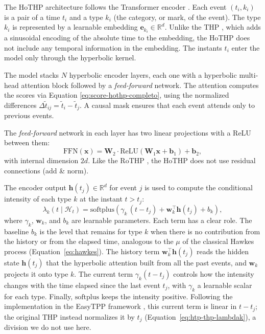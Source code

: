 The HoTHP architecture follows the Transformer encoder \cite{vaswani_attention_2017}. Each event $(t_i, k_i)$ is a pair of a time $t_i$ and a type $k_i$ (the category, or mark, of the event). The type $k_i$ is represented by a learnable embedding $\mathbf{e}_{k_i} \in \mathbb{R}^d$. Unlike the THP \cite{zuo_transformer_2021}, which adds a sinusoidal encoding of the absolute time to the embedding, the HoTHP does not include any temporal information in the embedding. The instants $t_i$ enter the model only through the hyperbolic kernel.

The model stacks $N$ hyperbolic encoder layers, each one with a hyperbolic multi-head attention block followed by a \textit{feed-forward} network. The attention computes the scores via Equation \ref{eq:score-hothp-completo}, using the normalized differences $\Delta\tilde{t}_{ij} = \tilde{t}_i - \tilde{t}_j$. A causal mask ensures that each event attends only to previous events.

The \textit{feed-forward} network in each layer has two linear projections with a ReLU between them:
%
\begin{equation}
    \mathrm{FFN}(\mathbf{x}) = \mathbf{W}_2 \cdot \mathrm{ReLU}(\mathbf{W}_1 \mathbf{x} + \mathbf{b}_1) + \mathbf{b}_2,
\end{equation}
%
with internal dimension $2d$. Like the RoTHP \cite{dai_rotary_2026}, the HoTHP does not use residual connections (add \& norm).

The encoder output $\mathbf{h}(t_j) \in \mathbb{R}^d$ for event $j$ is used to compute the conditional intensity of each type $k$ at the instant $t > t_j$:
%
\begin{equation}
    \lambda_k(t \mid \mathcal{H}_t)
    = \mathrm{softplus}\!\left(
        \gamma_k \, (t - t_j)
        + \mathbf{w}_k^\top \mathbf{h}(t_j)
        + b_k
    \right),
    \label{eq:intensidade-hothp}
\end{equation}
%
where $\gamma_k$, $\mathbf{w}_k$, and $b_k$ are learnable parameters. Each term has a clear role. The baseline $b_k$ is the level that remains for type $k$ when there is no contribution from the history or from the elapsed time, analogous to the $\mu$ of the classical Hawkes process (Equation~\eqref{eq:hawkes}). The history term $\mathbf{w}_k^\top \mathbf{h}(t_j)$ reads the hidden state $\mathbf{h}(t_j)$ that the hyperbolic attention built from all the past events, and $\mathbf{w}_k$ projects it onto type $k$. The current term $\gamma_k (t - t_j)$ controls how the intensity changes with the time elapsed since the last event $t_j$, with $\gamma_k$ a learnable scalar for each type. Finally, $\mathrm{softplus}$ keeps the intensity positive. Following the implementation in the EasyTPP framework \cite{xue_easytpp_2024}, this current term is linear in $t - t_j$; the original THP \cite{zuo_transformer_2021} instead normalizes it by $t_j$ (Equation~\eqref{eq:htp-thp-lambdak}), a division we do not use here.

